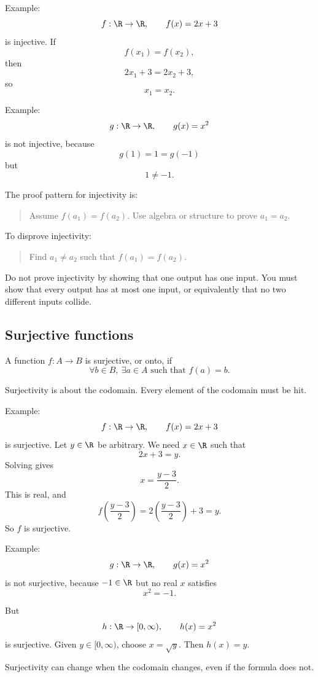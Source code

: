 Example:
\[
f:\R\to\R,\qquad f(x)=2x+3
\]
is injective. If
\[
f(x_1)=f(x_2),
\]
then
\[
2x_1+3=2x_2+3,
\]
so
\[
x_1=x_2.
\]

Example:
\[
g:\R\to\R,\qquad g(x)=x^2
\]
is not injective, because
\[
g(1)=1=g(-1)
\]
but
\[
1\neq -1.
\]

The proof pattern for injectivity is:

\begin{quote}
Assume $f(a_1)=f(a_2)$. Use algebra or structure to prove $a_1=a_2$.
\end{quote}

To disprove injectivity:

\begin{quote}
Find $a_1\neq a_2$ such that $f(a_1)=f(a_2)$.
\end{quote}

\begin{trapbox}
Do not prove injectivity by showing that one output has one input. You must show that every output has at most one input, or equivalently that no two different inputs collide.
\end{trapbox}

\subsection{Surjective functions}

\begin{formalbox}
A function $f:A\to B$ is surjective, or onto, if
\[
\forall b\in B,\ \exists a\in A\text{ such that }f(a)=b.
\]
\end{formalbox}

Surjectivity is about the codomain. Every element of the codomain must be hit.

Example:
\[
f:\R\to\R,\qquad f(x)=2x+3
\]
is surjective. Let $y\in\R$ be arbitrary. We need $x\in\R$ such that
\[
2x+3=y.
\]
Solving gives
\[
x=\frac{y-3}{2}.
\]
This is real, and
\[
f\left(\frac{y-3}{2}\right)=2\left(\frac{y-3}{2}\right)+3=y.
\]
So $f$ is surjective.

Example:
\[
g:\R\to\R,\qquad g(x)=x^2
\]
is not surjective, because $-1\in\R$ but no real $x$ satisfies
\[
x^2=-1.
\]

But
\[
h:\R\to[0,\infty),\qquad h(x)=x^2
\]
is surjective. Given $y\in[0,\infty)$, choose $x=\sqrt y$. Then $h(x)=y$.

\begin{focusbox}
Surjectivity can change when the codomain changes, even if the formula does not.
\end{focusbox}


